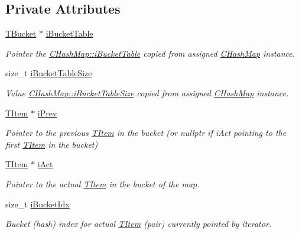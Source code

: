 \subsection*{Private Attributes}
\begin{DoxyCompactItemize}
\item 
\hyperlink{struct_c_hash_map_1_1_t_bucket}{T\+Bucket} $\ast$ \hyperlink{class_c_hash_map_1_1_c_forward_iterator_a64aafac64a1196ed4f0c0a08db2d366e}{i\+Bucket\+Table}
\begin{DoxyCompactList}\small\item\em Pointer the \hyperlink{class_c_hash_map_a1018fdaad71e8207e747db26e88025d6}{C\+Hash\+Map\+::i\+Bucket\+Table} copied from assigned \hyperlink{class_c_hash_map}{C\+Hash\+Map} instance. \end{DoxyCompactList}\item 
size\+\_\+t \hyperlink{class_c_hash_map_1_1_c_forward_iterator_a9b715a364a2123ad7fd772a3341baad8}{i\+Bucket\+Table\+Size}
\begin{DoxyCompactList}\small\item\em Value \hyperlink{class_c_hash_map_a8745c6aa08e235500828dea0ad30b548}{C\+Hash\+Map\+::i\+Bucket\+Table\+Size} copied from assigned \hyperlink{class_c_hash_map}{C\+Hash\+Map} instance. \end{DoxyCompactList}\item 
\hyperlink{struct_c_hash_map_1_1_t_item}{T\+Item} $\ast$ \hyperlink{class_c_hash_map_1_1_c_forward_iterator_a6b931e67da3ae68ef994208d5a0f3f47}{i\+Prev}
\begin{DoxyCompactList}\small\item\em Pointer to the previous \hyperlink{struct_c_hash_map_1_1_t_item}{T\+Item} in the bucket (or nullptr if {\ttfamily i\+Act} pointing to the first \hyperlink{struct_c_hash_map_1_1_t_item}{T\+Item} in the bucket) \end{DoxyCompactList}\item 
\hyperlink{struct_c_hash_map_1_1_t_item}{T\+Item} $\ast$ \hyperlink{class_c_hash_map_1_1_c_forward_iterator_a2d35146f69fc7b1b3edd849ee36f5a69}{i\+Act}
\begin{DoxyCompactList}\small\item\em Pointer to the actual \hyperlink{struct_c_hash_map_1_1_t_item}{T\+Item} in the bucket of the map. \end{DoxyCompactList}\item 
size\+\_\+t \hyperlink{class_c_hash_map_1_1_c_forward_iterator_a9639a0361741c7ee2fc7d4eabe525de6}{i\+Bucket\+Idx}
\begin{DoxyCompactList}\small\item\em Bucket (hash) index for actual \hyperlink{struct_c_hash_map_1_1_t_item}{T\+Item} (pair) currently pointed by iterator. \end{DoxyCompactList}\end{DoxyCompactItemize}
